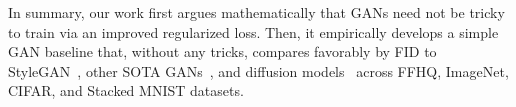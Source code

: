 
In summary, our work first argues mathematically that GANs need not be tricky to train via an improved regularized loss.
Then, it empirically develops a simple GAN baseline that, without any tricks, compares favorably by FID to StyleGAN~\cite{sg1,sg2,sg3}, other SOTA GANs~\cite{biggan,vitgan,ddgan}, and diffusion models~\cite{ddpm,sde,lsgm} across FFHQ, ImageNet, CIFAR, and Stacked MNIST datasets. %




